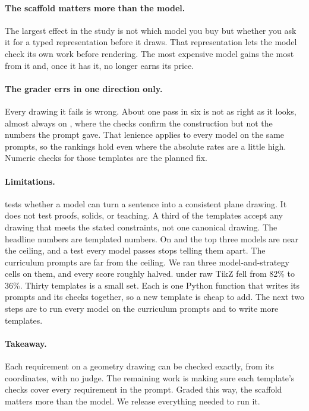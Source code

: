 \documentclass{article}
\begin{document}
\paragraph{The scaffold matters more than the model.}
The largest effect in the study is not which model you buy but whether you ask it for a typed representation before it draws.
That representation lets the model check its own work before rendering.
The most expensive model gains the most from it and, once it has it, no longer earns its price.

\paragraph{The grader errs in one direction only.}
Every drawing it fails is wrong.
About one pass in six is not as right as it looks, almost always on \ttwo, where the checks confirm the construction but not the numbers the prompt gave.
That lenience applies to every model on the same prompts, so the rankings hold even where the absolute rates are a little high.
Numeric checks for those templates are the planned fix.

\paragraph{Limitations.}
\GeoGenBench tests whether a model can turn a sentence into a consistent plane drawing.
It does not test proofs, solids, or teaching.
A third of the templates accept any drawing that meets the stated constraints, not one canonical drawing.
The headline numbers are templated numbers.
On \tone and \ttwo the top three models are near the ceiling, and a test every model passes stops telling them apart.
The curriculum prompts are far from the ceiling.
We ran three model-and-strategy cells on them, and every score roughly halved.
\haiku under raw TikZ fell from 82\% to 36\%.
Thirty templates is a small set.
Each is one Python function that writes its prompts and its checks together, so a new template is cheap to add.
The next two steps are to run every model on the curriculum prompts and to write more templates.

\paragraph{Takeaway.}
Each requirement on a geometry drawing can be checked exactly, from its coordinates, with no judge.
The remaining work is making sure each template's checks cover every requirement in the prompt.
Graded this way, the scaffold matters more than the model.
We release everything needed to run it.



\end{document}
